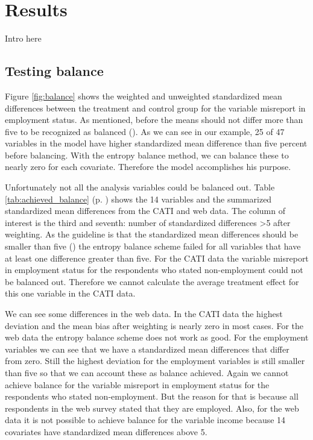 \section{Results}

Intro here

\subsection{Testing balance}
Figure \ref{fig:balance} shows the weighted and unweighted standardized mean differences between the treatment and control group for the variable misreport in employment status. As mentioned, before the means should not differ more than five to be recognized as balanced (\cite{Caliendoetal08}). As we can see in our example, 25 of 47 variables in the model have higher standardized mean difference than five percent before balancing. With the entropy balance method, we can balance these to nearly zero for each covariate. Therefore the model accomplishes his purpose.

Unfortunately not all the analysis variables could be balanced out. Table \ref{tab:achieved_balance} (p. \pageref{tab:achieved_balance}) shows the 14 variables and the summarized standardized mean differences from the CATI and web data. The column of interest is the third and seventh: number of standardized differences \textgreater5 after weighting. As the guideline is that the standardized mean differences should be smaller than five (\cite{Caliendoetal08}) the entropy balance scheme failed for all variables that have at least one difference greater than five. For the CATI data the variable misreport in employment status for the respondents who stated non-employment could not be balanced out. Therefore we cannot calculate the average treatment effect for this one variable in the CATI data.

We can see some differences in the web data. In the CATI data the highest deviation and the mean bias after weighting is nearly zero in most cases. For the web data the entropy balance scheme does not work as good. For the employment variables we can see that we have a standardized mean differences that differ from zero. Still the highest deviation for the employment variables is still smaller than five so that we can account these as balance achieved. Again we cannot achieve balance for the variable misreport in employment status for the respondents who stated non-employment. But the reason for that is because all respondents in the web survey stated that they are employed. Also, for the web data it is not possible to achieve balance for the variable income because 14 covariates have standardized mean differences above 5.

